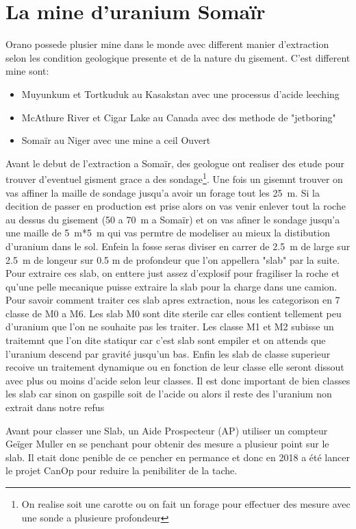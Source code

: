 \section{La mine d'uranium Somaïr}
Orano possede plusier mine dans le monde avec different manier d'extraction selon les condition geologique presente et de la nature du gisement. C'est different mine sont:
\begin{itemize}
    \item Muyunkum et Tortkuduk au Kasakstan avec une processus d'acide leeching
    \item McAthure River et Cigar Lake au Canada avec des methode de "jetboring"
    \item Somaïr au Niger avec une mine a ceil Ouvert
\end{itemize}
\par Avant le debut de l'extraction a Somaïr, des geologue ont realiser des etude pour trouver d'eventuel gisment grace a des sondage\footnote{On realise soit une carotte ou on fait un forage pour effectuer des mesure avec une sonde a plusieure profondeur}. Une fois un gisemnt trouver on vas affiner la maille de sondage jusqu'a avoir un forage tout les 25~m. Si la decition de passer en production est prise alors on vas venir enlever tout la roche au dessus du gisement (50 a 70~m a Somaïr) et on vas afiner le sondage jusqu'a une maille de 5~m*5~m qui vas permtre de modeliser au mieux la distibution d'uranium dans le sol. Enfein la fosse seras diviser en carrer de 2.5~m de large sur 2.5~m de longeur sur 0.5 m de profondeur que l'on appellera "slab" par la suite. Pour extraire ces slab, on enttere just assez d'explosif pour fragiliser la roche et qu'une pelle mecanique puisse extraire la slab pour la charge dans une camion. Pour savoir comment traiter ces slab apres extraction, nous les categorison en 7 classe de M0 a M6. Les slab M0 sont dite sterile car elles contient tellement peu d'uranium que l'on ne souhaite pas les traiter. Les classe M1 et M2 subisse un traitemnt que l'on dite statiqur car c'est slab sont empiler et on attends que l'uranium descend par gravité jusqu'un bas. Enfin les slab de classe superieur recoive un traitement dynamique ou en fonction de leur classe elle seront dissout avec plus ou moins d'acide selon leur classes. Il est donc important de bien classes les slab car sinon on gaspille soit de l'acide ou alors il reste des l'uranium non extrait dans notre refus
\par
Avant pour classer une Slab, un Aide Prospecteur (AP) utiliser un compteur Geïger Muller en se penchant pour obtenir des mesure a plusieur point sur le slab. Il etait donc penible de ce pencher en permance et donc en 2018 a été lancer le projet CanOp pour reduire la penibiliter de la tache.
